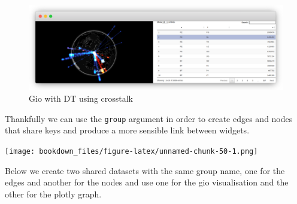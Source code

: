 \documentclass[
]{krantz}
\makeatletter
\newenvironment{Shaded}{\begin{snugshade}}{\end{snugshade}}
\newcommand{\CommentTok}[1]{\textcolor[rgb]{0.37,0.37,0.37}{\textit{#1}}}
\newcommand{\DataTypeTok}[1]{\textcolor[rgb]{0.27,0.27,0.27}{#1}}
\newcommand{\KeywordTok}[1]{\textcolor[rgb]{0.27,0.27,0.27}{\textbf{#1}}}
\newcommand{\NormalTok}[1]{#1}
\newcommand{\OperatorTok}[1]{\textcolor[rgb]{0.43,0.43,0.43}{\textbf{#1}}}
\newcommand{\StringTok}[1]{\textcolor[rgb]{0.5,0.5,0.5}{#1}}
\newenvironment{kframe}{%
\medskip{}
\setlength{\fboxsep}{.8em}
 \def\at@end@of@kframe{}%
 \ifinner\ifhmode%
  \def\at@end@of@kframe{\end{minipage}}%
  \begin{minipage}{\columnwidth}%
 \fi\fi%
 \def\FrameCommand##1{\hskip\@totalleftmargin \hskip-\fboxsep
 \colorbox{shadecolor}{##1}\hskip-\fboxsep
     \hskip-\linewidth \hskip-\@totalleftmargin \hskip\columnwidth}%
 \MakeFramed {\advance\hsize-\width
   \@totalleftmargin\z@ \linewidth\hsize
   \@setminipage}}%
 {\par\unskip\endMakeFramed%
 \at@end@of@kframe}
\renewenvironment{Shaded}{\begin{kframe}}{\end{kframe}}
\makeatother
\begin{document}
\begin{Shaded}
\end{Shaded}

\begin{figure}
\centering
\includegraphics{images/crosstalk-gio-1.png}
\caption{Gio with DT using crosstalk}
\end{figure}

Thankfully we can use the \texttt{group} argument in order to create edges and nodes that share keys and produce a more sensible link between widgets.

\texttt{[image: bookdown\_files/figure-latex/unnamed-chunk-50-1.png]}

Below we create two shared datasets with the same group name, one for the edges and another for the nodes and use one for the gio visualisation and the other for the plotly graph.
\end{document}
